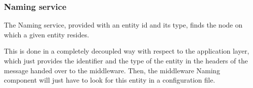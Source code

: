 \subsubsection{Naming service}
The Naming service, provided with an entity id and its type, finds the node on
which a given entity resides.

This is done in a completely decoupled way with respect to the application
layer, which just provides the identifier and the type of the entity in the
headers of the message handed over to the middleware. Then, the middleware
Naming component will just have to look for this entity in a configuration
file.
